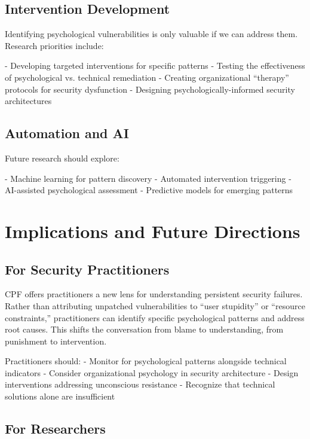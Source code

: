 \documentclass[11pt,a4paper]{article}
\begin{document}
\subsection{Intervention Development}

Identifying psychological vulnerabilities is only valuable if we can address them. Research priorities include:

- Developing targeted interventions for specific patterns
- Testing the effectiveness of psychological vs. technical remediation
- Creating organizational ``therapy'' protocols for security dysfunction
- Designing psychologically-informed security architectures

\subsection{Automation and AI}

Future research should explore:

- Machine learning for pattern discovery
- Automated intervention triggering
- AI-assisted psychological assessment
- Predictive models for emerging patterns

\section{Implications and Future Directions}

\subsection{For Security Practitioners}

CPF offers practitioners a new lens for understanding persistent security failures. Rather than attributing unpatched vulnerabilities to ``user stupidity'' or ``resource constraints,'' practitioners can identify specific psychological patterns and address root causes. This shifts the conversation from blame to understanding, from punishment to intervention.

Practitioners should:
- Monitor for psychological patterns alongside technical indicators
- Consider organizational psychology in security architecture
- Design interventions addressing unconscious resistance
- Recognize that technical solutions alone are insufficient

\subsection{For Researchers}
\end{document}
